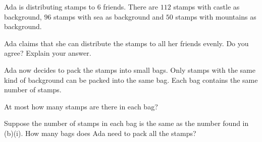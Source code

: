  Ada is distributing stamps to $6$ friends. There are $112$ stamps with castle as background, $96$ stamps with sea as background and $50$ stamps with mountains as background.

\begin{subparts}
  \item Ada claims that she can distribute the stamps to all her friends evenly. Do you agree? Explain your answer.

  \item Ada now decides to pack the stamps into small bags. Only stamps with the same kind of background can be packed into the same bag. Each bag contains the same number of stamps.
  \begin{subpartsii}[1]
    \item At most how many stamps are there in each bag?
    \item Suppose the number of stamps in each bag is the same as the number found in (b)(i). How many bags does Ada need to pack all the stamps?
  \end{subpartsii}
\end{subparts}

